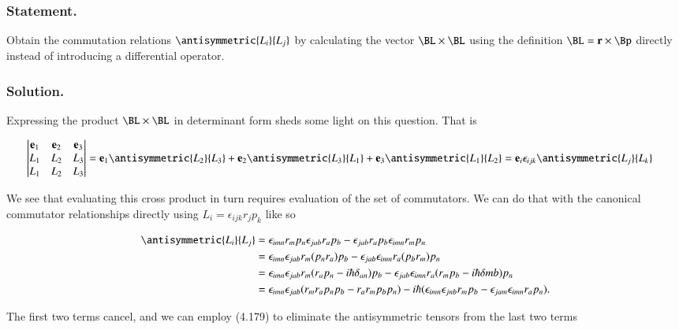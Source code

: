 \subsubsection{Statement.}

Obtain the commutation relations $\antisymmetric{L_i}{L_j}$ by calculating the vector $\BL \cross \BL$ using the definition $\BL = \Br \cross \Bp$ directly instead of introducing a differential operator.

\subsubsection{Solution.}

Expressing the product $\BL \cross \BL$ in determinant form sheds some light on this question.  That is

\begin{align}\label{eqn:desaiCh4:300}
\begin{vmatrix}
 \Be_1 & \Be_2 & \Be_3 \\
 L_1 & L_2 & L_3 \\
 L_1 & L_2 & L_3
\end{vmatrix}
&=
 \Be_1 \antisymmetric{L_2}{L_3}
 +\Be_2 \antisymmetric{L_3}{L_1}
 +\Be_3 \antisymmetric{L_1}{L_2}
= \Be_i \epsilon_{ijk} \antisymmetric{L_j}{L_k}
\end{align}

We see that evaluating this cross product in turn requires evaluation of the set of commutators.  We can do that with the canonical commutator relationships directly using $L_i = \epsilon_{ijk} r_j p_k$ like so

\begin{align*}
\antisymmetric{L_i}{L_j}
&=
\epsilon_{imn} r_m p_n \epsilon_{jab} r_a p_b
- \epsilon_{jab} r_a p_b \epsilon_{imn} r_m p_n \\
&=
\epsilon_{imn} \epsilon_{jab} r_m (p_n r_a) p_b
- \epsilon_{jab} \epsilon_{imn} r_a (p_b r_m) p_n \\
&=
\epsilon_{imn} \epsilon_{jab} r_m (r_a p_n -i \hbar \delta_{an}) p_b
- \epsilon_{jab} \epsilon_{imn} r_a (r_m p_b - i \hbar \delta{mb}) p_n \\
&=
\epsilon_{imn} \epsilon_{jab} (r_m r_a p_n p_b - r_a r_m p_b p_n )
- i \hbar ( \epsilon_{imn} \epsilon_{jnb} r_m p_b - \epsilon_{jam} \epsilon_{imn} r_a p_n ).
\end{align*}

The first two terms cancel, and we can employ (4.179) to eliminate the antisymmetric tensors from the last two terms

